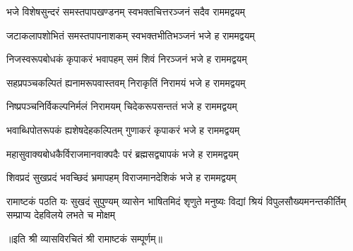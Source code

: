 
\twolineshloka
{भजे विशेषसुन्दरं समस्तपापखण्डनम्}
{स्वभक्तचित्तरञ्जनं सदैव राममद्वयम्}

\twolineshloka
{जटाकलापशोभितं समस्तपापनाशकम्}
{स्वभक्तभीतिभञ्जनं भजे ह राममद्वयम्}

\twolineshloka
{निजस्वरूपबोधकं कृपाकरं भवापहम्}
{समं शिवं निरञ्जनं भजे ह राममद्वयम्}

\twolineshloka
{सहप्रपञ्चकल्पितं ह्यनामरूपवास्तवम्}
{निराकृतिं निरामयं भजे ह राममद्वयम्}

\twolineshloka
{निष्प्रपञ्चनिर्विकल्पनिर्मलं निरामयम्}
{चिदेकरूपसन्ततं भजे ह राममद्वयम्}

\twolineshloka
{भवाब्धिपोतरूपकं ह्यशेषदेहकल्पितम्}
{गुणाकरं कृपाकरं भजे ह राममद्वयम्}

\twolineshloka
{महासुवाक्यबोधकैर्विराजमानवाक्पदैः}
{परं ब्रह्मसद्व्यापकं भजे ह राममद्वयम्}

\twolineshloka
{शिवप्रदं सुखप्रदं भवच्छिदं भ्रमापहम्}
{विराजमानदेशिकं भजे ह राममद्वयम्}

\fourlineindentedshloka
{रामाष्टकं पठति यः सुखदं सुपुण्यम्}
{व्यासेन भाषितमिदं शृणुते मनुष्यः}
{विद्यां श्रियं विपुलसौख्यमनन्तकीर्तिम्}
{सम्प्राप्य देहविलये लभते च मोक्षम्}
  
॥इति श्री व्यासविरचितं श्री रामाष्टकं सम्पूर्णम्॥